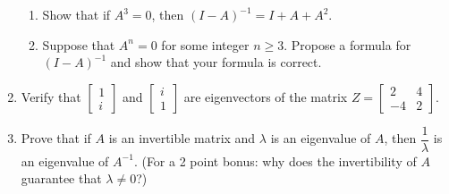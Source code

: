 \documentclass[12pt]{article}
\newcommand{\points}[1]{\marginpar{\hspace{24pt}[#1]}}
\newcommand{\bbm}{\begin{bmatrix}}
\newcommand{\ebm}{\end{bmatrix}}
\begin{document}
\begin{enumerate}
\begin{enumerate}
 \item Show that if $A^3=0$, then $(I-A)^{-1} = I+A+A^2$. \points{2}

\vspace{2.25in}

 \item Suppose that $A^n=0$ for some integer $n\geq 3$. Propose a formula for $(I-A)^{-1}$ and show that your formula is correct. \points{3}



\end{enumerate}


\newpage

 \item Verify that $\bbm 1\\i\ebm$ and $\bbm i\\1\ebm$ are eigenvectors of the matrix $Z = \bbm 2&4\\-4&2\ebm$. \points{3}

\vspace{4in}

 \item Prove that if $A$ is an invertible matrix and $\lambda$ is an eigenvalue of $A$, then $\dfrac{1}{\lambda}$ is an eigenvalue of $A^{-1}$. \points{4}
(For a 2 point bonus: why does the invertibility of $A$ guarantee that $\lambda\neq 0$?)






\end{enumerate}
\end{document}

